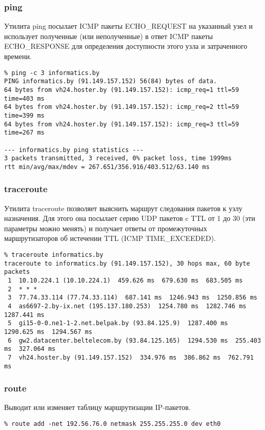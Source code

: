 \subsubsection{ping}
Утилита ping посылает ICMP пакеты ECHO\_REQUEST на указанный узел и использует полученные (или неполученные) в ответ ICMP пакеты ECHO\_RESPONSE для определения доступности этого узла и затраченного времени.
\lstset{language=,caption=}
\begin{lstlisting}
% ping -c 3 informatics.by
PING informatics.by (91.149.157.152) 56(84) bytes of data.
64 bytes from vh24.hoster.by (91.149.157.152): icmp_req=1 ttl=59 time=403 ms
64 bytes from vh24.hoster.by (91.149.157.152): icmp_req=2 ttl=59 time=399 ms
64 bytes from vh24.hoster.by (91.149.157.152): icmp_req=3 ttl=59 time=267 ms

--- informatics.by ping statistics ---
3 packets transmitted, 3 received, 0% packet loss, time 1999ms
rtt min/avg/max/mdev = 267.651/356.916/403.512/63.140 ms
\end{lstlisting}

\subsubsection{traceroute}
Утилита traceroute позволяет выяснить маршрут следования пакетов к узлу назначения. Для этого она посылает серию UDP пакетов c TTL от 1 до 30 (эти параметры можно менять) и получает ответы от промежуточных маршрутизаторов об истечении TTL (ICMP TIME\_EXCEEDED).
\lstset{language=,caption=}
\begin{lstlisting}
% traceroute informatics.by
traceroute to informatics.by (91.149.157.152), 30 hops max, 60 byte packets
 1  10.10.224.1 (10.10.224.1)  459.626 ms  679.630 ms  683.505 ms
 2  * * *
 3  77.74.33.114 (77.74.33.114)  687.141 ms  1246.943 ms  1250.856 ms
 4  as6697-2.by-ix.net (195.137.180.253)  1254.780 ms  1282.746 ms  1287.441 ms
 5  gi15-0-0.ne1-1-2.net.belpak.by (93.84.125.9)  1287.400 ms  1290.625 ms  1294.567 ms
 6  gw2.datacenter.beltelecom.by (93.84.125.165)  1294.530 ms  255.403 ms  327.064 ms
 7  vh24.hoster.by (91.149.157.152)  334.976 ms  386.862 ms  762.791 ms
\end{lstlisting}

\subsubsection{route}
Выводит или изменяет таблицу маршрутизации IP-пакетов.
\lstset{language=,caption=}
\begin{lstlisting}
% route add -net 192.56.76.0 netmask 255.255.255.0 dev eth0
\end{lstlisting}

